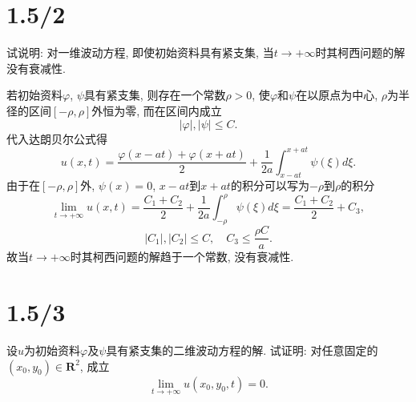 \documentclass[11pt,a4paper]{article}
\author{刘逸灏 (515370910207)}
\begin{document}
\maketitle

\section{1.5/2}
\begin{problem}
试说明: 对一维波动方程, 即使初始资料具有紧支集, 当$t\to+\infty$时其柯西问题的解没有衰减性.
\end{problem}

若初始资料$\varphi$, $\psi$具有紧支集, 则存在一个常数$\rho>0$, 使$\varphi$和$\psi$在以原点为中心, $\rho$为半径的区间$[-\rho,\rho]$外恒为零, 而在区间内成立
$$|\varphi|,|\psi|\leqslant C.$$
代入达朗贝尔公式得
$$u(x,t)=\frac{\varphi(x-at)+\varphi(x+at)}{2}+\frac{1}{2a}\int_{x-at}^{x+at}\psi(\xi)d\xi.$$
由于在$[-\rho,\rho]$外, $\psi(x)=0$, $x-at$到$x+at$的积分可以写为$-\rho$到$\rho$的积分
$$\lim_{t\to+\infty}u(x,t)=\frac{C_1+C_2}{2}+\frac{1}{2a}\int_{-\rho}^{\rho}\psi(\xi)d\xi=\frac{C_1+C_2}{2}+C_3,$$
$$|C_1|,|C_2|\leqslant C,\quad C_3\leqslant\frac{\rho C}{a}.$$
故当$t\to+\infty$时其柯西问题的解趋于一个常数, 没有衰减性.

\section{1.5/3}
\begin{problem}
设$u$为初始资料$\varphi$及$\psi$具有紧支集的二维波动方程的解. 试证明: 对任意固定的$(x_0,y_0)\in \mathbf{R}^2$, 成立
$$\lim_{t\to+\infty} u(x_0,y_0,t)=0.$$
\end{problem}
\end{document}
